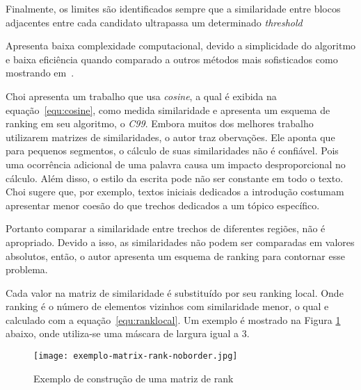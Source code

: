 Finalmente, os limites são identificados sempre que a similaridade entre blocos adjacentes entre cada candidato ultrapassa um determinado \textit{threshold}

Apresenta baixa complexidade computacional, devido a simplicidade do algoritmo e baixa eficiência quando comparado a outros métodos mais sofisticados como mostrando em~\cite{Choi2000, Kern2009}.




Choi \cite{Choi2000} apresenta um trabalho que usa \textit{cosine}, a qual é exibida na equação~\ref{equ:cosine}, como medida similaridade e apresenta um esquema de ranking em seu algoritmo, o \textit{C99}. 
%
Embora muitos dos melhores trabalho utilizarem matrizes de similaridades, o autor traz obervações.
%
Ele aponta que para pequenos segmentos, o cálculo de suas similaridades não é confiável. Pois uma ocorrência adicional de uma palavra causa um impacto desproporcional no cálculo.
%
Além disso, o estilo da escrita pode não ser constante em todo o texto. Choi sugere que, por exemplo, textos iniciais dedicados a introdução costumam apresentar menor coesão do que trechos dedicados a um tópico específico. 
%

Portanto comparar a similaridade entre trechos de diferentes regiões, não é apropriado.
Devido a isso, as similaridades não podem ser comparadas em valores absolutos,  então, o autor apresenta um esquema de ranking para contornar esse problema.
%



Cada valor na matriz de similaridade é substituído por seu ranking local. Onde ranking é o número de elementos vizinhos com similaridade menor, o qual e calculado com a equação~\ref{equ:ranklocal}. Um exemplo é mostrado na Figura \ref{fig:exemplomatrixrank} abaixo, onde utiliza-se uma máscara de largura igual a 3.



  \begin{figure}[!h]

	\centering
	\texttt{[image: exemplo-matrix-rank-noborder.jpg]}
	\caption{Exemplo de construção de uma matriz de rank}
	\label{fig:exemplomatrixrank}

  \end{figure}




